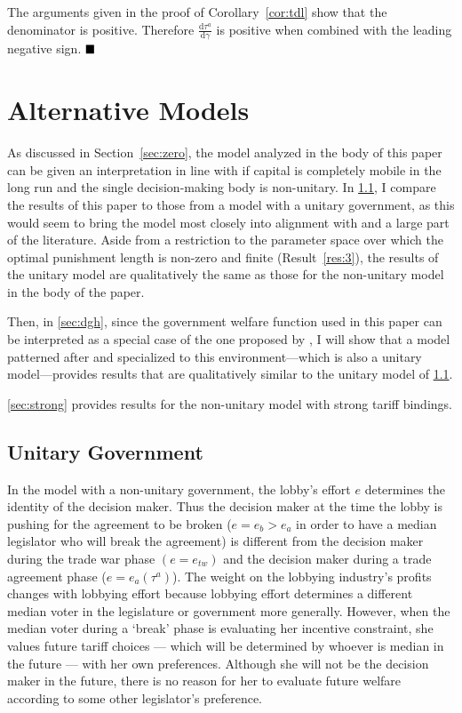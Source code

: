 \documentclass[authoryear, review]{elsarticle}
\newcommand{\ga}{\gamma}
\begin{document}
The arguments given in the proof of Corollary~\ref{cor:tdl} show that the denominator is positive. Therefore $\frac{\mathrm{d} \tau^a}{\mathrm{d} \ga}$ is positive when combined with the leading negative sign. $\hfill\blacksquare$


\section{Alternative Models}
\label{sec:alternatives}

As discussed in Section~\ref{sec:zero}, the model analyzed in the body of this paper can be given an interpretation in line with \citet{mrc2007} if capital is completely mobile in the long run and the single decision-making body is non-unitary. In \ref{sec:unitary}, I compare the results of this paper to those from a model with a unitary government, as this would seem to bring the model most closely into alignment with \citet{mrc2007} and a large part of the literature. Aside from a restriction to the parameter space over which the optimal punishment length is non-zero and finite (Result~\ref{res:3}), the results of the unitary model are qualitatively the same as those for the non-unitary model in the body of the paper.

Then, in \ref{sec:dgh}, since the government welfare function used in this paper can be interpreted as a special case of the one proposed by \citet{dgh97}, I will show that a model patterned after \citet{dgh97} and specialized to this environment---which is also a unitary model---provides results that are qualitatively similar to the unitary model of \ref{sec:unitary}.

\ref{sec:strong} provides results for the non-unitary model with strong tariff bindings.

\subsection{Unitary Government}
\label{sec:unitary}
In the model with a non-unitary government, the lobby's effort $e$ determines the identity of the decision maker. Thus the decision maker at the time the lobby is pushing for the agreement to be broken ($e=e_b>e_a$ in order to have a median legislator who will break the agreement) is different from the decision maker during the trade war phase $(e = e_{tw})$ and the decision maker during a trade agreement phase ($e=e_a(\tau^a)$). The weight on the lobbying industry's profits changes with lobbying effort because lobbying effort determines a different median voter in the legislature or government more generally. However, when the median voter during a `break' phase is evaluating her incentive constraint, she values future tariff choices --- which will be determined by whoever is median in the future --- with her own preferences. Although she will not be the decision maker in the future, there is no reason for her to evaluate future welfare according to some other legislator's preference.
\end{document}
